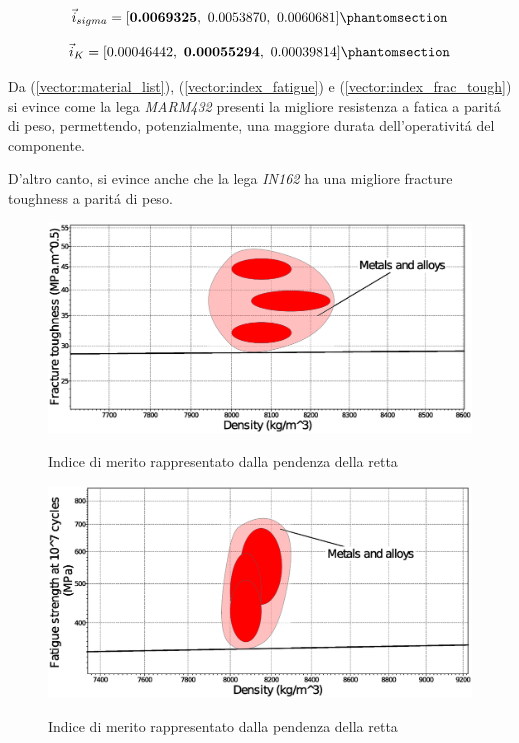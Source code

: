 \documentclass{article}
\begin{document}
        \begin{equation}
            \vec{i}_{sigma} = [\textbf{0.0069325}, \  0.0053870, \  0.0060681
            ]
            \phantomsection \label{vector:index_fatigue}
        \end{equation}

        \begin{equation}
            \vec{i}_{K} = [0.00046442, \  \textbf{0.00055294}, \  0.00039814]
            \phantomsection \label{vector:index_frac_tough}
        \end{equation}

        Da (\ref{vector:material_list}), (\ref{vector:index_fatigue}) e (\ref{vector:index_frac_tough}) si evince come 
        la lega \textit{MARM432} presenti la migliore resistenza a fatica a paritá di peso, permettendo, potenzialmente, 
        una maggiore durata dell'operativitá del componente.

        D'altro canto, si evince anche che la lega \textit{IN162} ha una migliore fracture toughness a paritá di peso. 

        
            \begin{figure}[h!]
                 \label{fig:indici_retta_frac}
                \includegraphics[width=\textwidth]{retta_frac.eps}
                \caption{Indice di merito rappresentato dalla pendenza della retta}
            \end{figure}

            \begin{figure}[h!]
                 \label{fig:indici_retta_fatigue}
                \includegraphics[width=\textwidth]{retta_fatigue.eps}
                \caption{Indice di merito rappresentato dalla pendenza della retta}
            \end{figure}
\end{document}
